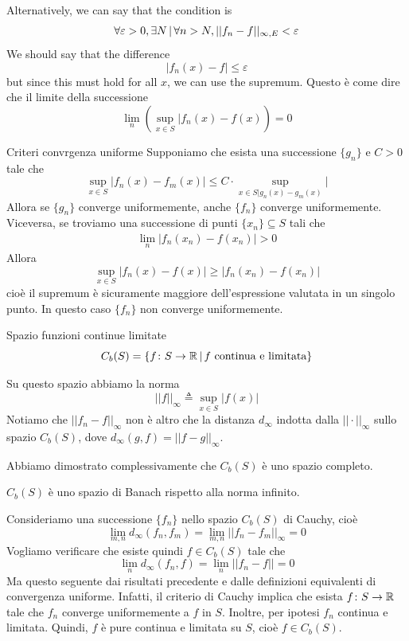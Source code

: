 \documentclass[a4paper]{article}
\begin{document}
Alternatively, we can say that the condition is
\[
    \forall \varepsilon > 0, \exists N \,|\, \forall n>N, ||f_n-f||_{\infty, E} < \varepsilon
\]
We should say that the difference
\[
    |f_n(x) - f| \leq \varepsilon
\]
but since this must hold for all \(x\), we can use the supremum.
Questo è come dire che il limite della successione
\[
    \lim_n \left(\sup_{x\in S} |f_n(x) - f(x)\right) = 0
\]

\begin{snippetproposition}{Criteri convrgenza uniforme}
    Supponiamo che esista una successione \(\{g_n\}\) e \(C>0\) tale che
    \[
        \sup_{x\in S} |f_n(x) - f_m(x)| \leq C \cdot \sup_{x\in S |g_n(x) - g_m(x)}|
    \]
    Allora se \(\{g_n\}\) converge uniformemente, anche \(\{f_n\}\) converge uniformemente.
    Viceversa, se troviamo una successione di punti \(\{x_n\} \subseteq S\)
    tali che
    \begin{align*}
        \lim_n |f_n(x_n) - f(x_n)| > 0
    \end{align*}
    Allora \[
        \sup_{x\in S} |f_n(x) - f(x)| \geq |f_n(x_n) - f(x_n)|
    \]
    cioè il supremum è sicuramente maggiore dell'espressione valutata in un singolo punto.
    In questo caso \(\{f_n\}\) non converge uniformemente.
\end{snippetproposition}

\begin{snippetdefinition}{Spazio funzioni continue limitate}
    \[
        C_b(S) = \{
            f \colon S \to \mathbb{R} \,|\,
            f \text{ continua e limitata}    
        \}
    \]
\end{snippetdefinition}

Su questo spazio abbiamo la norma
\[
    ||f||_{\infty} \triangleq \sup_{x \in S} |f(x)|
\]
Notiamo che \(||f_n-f||_\infty\) non è altro che la distanza \(d_\infty\)
indotta dalla \(||\cdot||_\infty\) sullo spazio \(C_b(S)\),
dove \(d_\infty(g, f) = ||f-g||_\infty\).

Abbiamo dimostrato complessivamente che \(C_b(S)\) è uno spazio completo.

\begin{snippettheorem}{}
    \(C_b(S)\) è uno spazio di Banach rispetto alla norma infinito.
\end{snippettheorem}

\begin{snippetproof}{}
    Consideriamo una successione \(\{f_n\}\) nello spazio \(C_b(S)\) di Cauchy, cioè
    \[
        \lim_{m,n} d_\infty(f_n, f_m) = \lim_{m,n} ||f_n - f_m||_\infty = 0
    \]
    Vogliamo verificare che esiste quindi \(f \in C_b(S)\) tale che
    \[
        \lim_n d_\infty(f_n, f) = \lim_n ||f_n - f|| = 0
    \]
    Ma questo seguente dai risultati precedente e dalle definizioni equivalenti di convergenza uniforme.
    Infatti, il criterio di Cauchy implica
    che esista \(f \colon S \to \mathbb{R}\) tale che \(f_n\) converge uniformemente a \(f\) in \(S\).
    Inoltre, per ipotesi \(f_n\) continua e limitata.
    Quindi, \(f\) è pure continua e limitata su \(S\), cioè \(f \in C_b(S)\).
\end{snippetproof}
\end{document}
